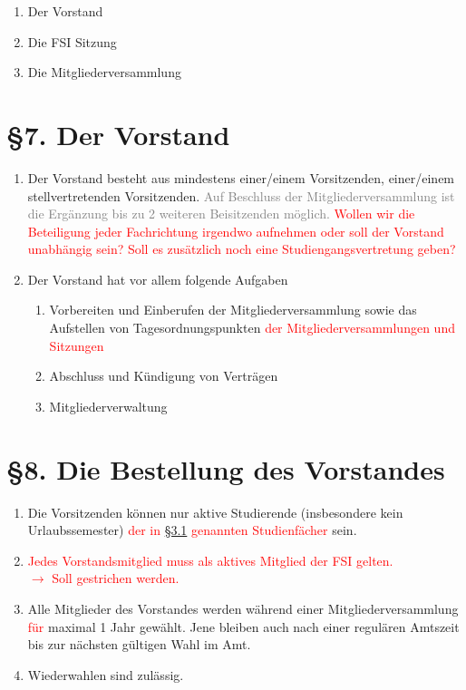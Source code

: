 \documentclass[a4paper,12pt]{article}
\newcommand{\red}[1]{\textcolor{red}{#1}}
\newcommand{\gray}[1]{\textcolor{gray}{#1}}
\begin{document}
\begin{enumerate}
	\item
		Der Vorstand
	\item
		Die FSI Sitzung
	\item
		Die Mitgliederversammlung
\end{enumerate}

\section*{§7. Der Vorstand}

\begin{enumerate}
    	\item
		Der Vorstand besteht aus mindestens einer/einem Vorsitzenden,
		einer/einem stellvertretenden Vorsitzenden. \gray{Auf Beschluss der
		Mitgliederversammlung ist die Ergänzung bis zu 2 weiteren
		Beisitzenden möglich.}
		\red{Wollen wir die Beteiligung jeder Fachrichtung irgendwo aufnehmen oder soll der Vorstand unabhängig sein? Soll es zusätzlich noch eine Studiengangsvertretung geben?}
    	\item
		Der Vorstand hat vor allem folgende Aufgaben
    		\begin{enumerate}[label=(\roman*)]
			\item
				Vorbereiten und Einberufen der
				Mitgliederversammlung sowie das Aufstellen von
				Tagesordnungspunkten \red{der Mitgliederversammlungen und Sitzungen}
        		\item
				Abschluss und Kündigung von Verträgen
        		\item
				Mitgliederverwaltung
    		\end{enumerate}
\end{enumerate}

\section*{§8. Die Bestellung des Vorstandes}

\begin{enumerate}
	\item
		Die Vorsitzenden können nur aktive Studierende (insbesondere
		kein Urlaubssemester) \red{der in \hyperref[3.1]{§3.1} genannten Studienfächer} sein.
	\item
		\red{
			Jedes Vorstandsmitglied muss als aktives Mitglied der
			FSI gelten. \\
			$\rightarrow$ Soll gestrichen werden.
		}
	\item
		Alle Mitglieder des Vorstandes werden während einer
		Mitgliederversammlung \red{für} maximal 1 Jahr gewählt. Jene bleiben
		auch nach einer regulären Amtszeit bis zur nächsten gültigen
		Wahl im Amt.
	\item
		Wiederwahlen sind zulässig.
\end{enumerate}
\end{document}
